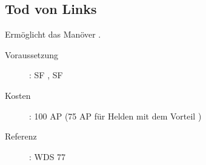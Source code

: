 \subsection{Tod von Links}
\label{sf.tod_von_links}
Ermöglicht das Manöver .
\begin{description}
    \item[Voraussetzung]:
        SF , SF 
    \item [Kosten]:
        100 AP (75 AP für Helden mit dem Vorteil )
    \item [Referenz]:
        WDS 77
\end{description}

